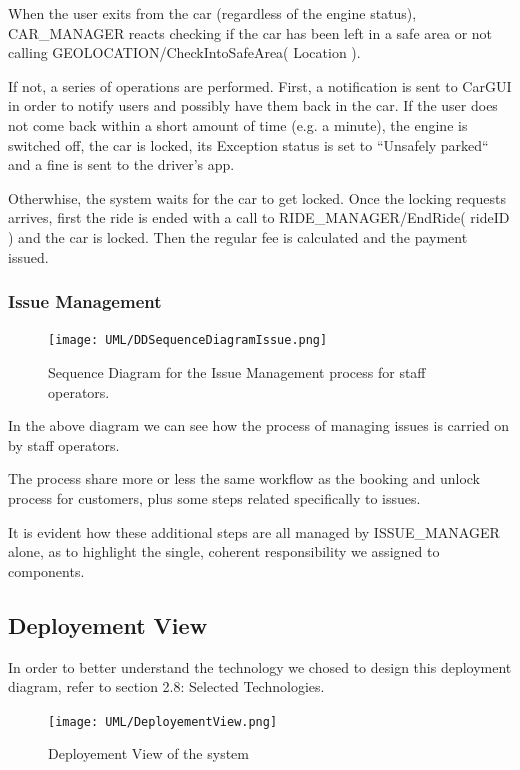 \documentclass[11pt]{article} %
\begin{document}
When the user exits from the car (regardless of the engine status), CAR\_MANAGER reacts checking if the car has been left in a safe area or not calling GEOLOCATION/CheckIntoSafeArea( Location ).

If not, a series of operations are performed. First, a notification is sent to CarGUI in order to notify users and possibly have them back in the car. If the user does not come back within a short amount of time (e.g. a minute), the engine is switched off, the car is locked, its Exception status is set to ``Unsafely parked`` and a fine is sent to the driver's app.

Otherwhise, the system waits for the car to get locked. Once the locking requests arrives, first the ride is ended with a call to RIDE\_MANAGER/EndRide( rideID ) and the car is locked. Then the regular fee is calculated and the payment issued.


\subsubsection{Issue Management}
\begin{figure}[H]
	\centering
	\texttt{[image: UML/DDSequenceDiagramIssue.png]}
	\caption{Sequence Diagram for the Issue Management process for staff operators.}
\end{figure}

In the above diagram we can see how the process of managing issues is carried on by staff operators.

The process share more or less the same workflow as the booking and unlock process for customers, plus some steps related specifically to issues.

It is evident how these additional steps are all managed by ISSUE\_MANAGER alone, as to highlight the single, coherent responsibility we assigned to components.


\subsection{Deployement View}

In order to better understand the technology we chosed to design this deployment diagram, refer to section 2.8: Selected Technologies.

\begin{figure}[H]
	\centering
	\texttt{[image: UML/DeployementView.png]}
	\caption{Deployement View of the system}
\end{figure}
\end{document}
